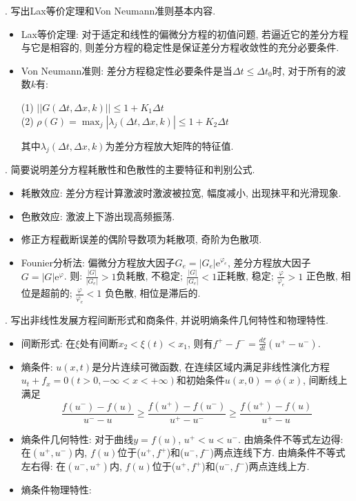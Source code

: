 . 写出Lax等价定理和Von Neumann准则基本内容.
\begin{itemize}
\item Lax等价定理: 对于适定和线性的偏微分方程的初值问题, 若逼近它的差分方程与它是相容的, 则差分方程的稳定性是保证差分方程收敛性的充分必要条件.
\item Von Neumann准则: 差分方程稳定性必要条件是当$\Delta t\leq \Delta t_0$时, 对于所有的波数$k$有:

    (1) $||G(\Delta t, \Delta x, k)||\leq 1 + K_1 \Delta t$\\
    (2) $\rho(G)=\max_j|\lambda_j(\Delta t, \Delta x, k)|\leq 1 + K_2\Delta t$

其中$\lambda_j(\Delta t, \Delta x, k)$为差分方程放大矩阵的特征值.
\end{itemize}

. 简要说明差分方程耗散性和色散性的主要特征和判别公式.
\begin{itemize}
\item 耗散效应: 差分方程计算激波时激波被拉宽, 幅度减小, 出现抹平和光滑现象.
\item 色散效应: 激波上下游出现高频振荡.
\item 修正方程截断误差的偶阶导数项为耗散项, 奇阶为色散项.
\item Founier分析法: 偏微分方程放大因子$G_e=|G_e|\mathrm{e}^{\varphi_e}$, 差分方程放大因子$G=|G|\mathrm{e}^{\varphi}$. 则: $\frac{|G|}{|G_e|}>1$负耗散, 不稳定; $\frac{|G|}{|G_e|}<1$正耗散, 稳定; $\frac{\varphi}{\varphi_e}>1$ 正色散, 相位是超前的; $\frac{\varphi}{\varphi_e}<1$ 负色散, 相位是滞后的.
\end{itemize}
\vspace{1em}

. 写出非线性发展方程间断形式和商条件, 并说明熵条件几何特性和物理特性.
\begin{itemize}
\item 间断形式: 在$\xi$处有间断$x_2<\xi(t)<x_1$, 则有$f^+-f^-=\frac{d\xi}{dt}(u^+-u^-)$.
\item 熵条件: $u(x,t)$是分片连续可微函数, 在连续区域内满足非线性演化方程$u_t+f_x=0(t>0, -\infty<x<+\infty)$和初始条件$u(x,0)=\phi(x)$, 间断线上满足
    \[
    \frac{f(u^{-})-f(u)}{u^{-}-u}
    \geq
    \frac{f(u^{+})-f(u^{-})}{u^{+}-u^{-}}
    \geq
    \frac{f(u^{+})-f(u)}{u^{+}-u}
    \]
\item 熵条件几何特性: 对于曲线$y=f(u)$, $u^+<u<u^-$. 由熵条件不等式左边得:
    在$(u^+,u^-)$内, $f(u)$位于($u^+,f^+$)和($u^-,f^-$)两点连线下方.
        由熵条件不等式左右得: 在$(u^-,u^+)$内, $f(u)$位于($u^+,f^+$)和($u^-,f^-$)两点连线上方.
\item 熵条件物理特性:
\end{itemize}
\vspace{1em}

